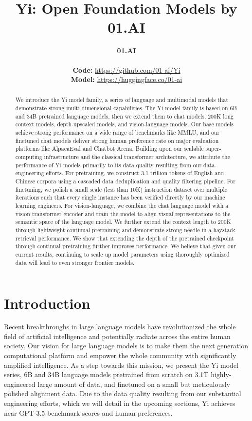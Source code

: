 \documentclass[numbers,sort&compress]{article}
\title{Yi: Open Foundation Models by 01.AI }
\author{
  \textbf{01.AI} \\
  \; \\ 
  \textbf{Code:}\; \url{https://github.com/01-ai/Yi}\\
  \textbf{Model:}\; \url{https://huggingface.co/01-ai} \\
}
\begin{document}
\maketitle

\begin{abstract}

We introduce the Yi model family, a series of language and multimodal models that demonstrate strong multi-dimensional capabilities. 
The Yi model family is based on 6B and 34B pretrained language models, then we extend them to chat models, 200K long context models, depth-upscaled models, and vision-language models. 
Our base models achieve strong performance on a wide range of benchmarks like MMLU, 
and our finetuned chat models deliver strong human preference rate on major evaluation platforms like AlpacaEval and Chatbot Arena.
Building upon our scalable super-computing infrastructure and the classical transformer architecture, 
we attribute the performance of Yi models primarily to its data quality resulting from our data-engineering efforts. 
For pretraining, we construct 3.1 trillion tokens of English and Chinese corpora using a cascaded data deduplication and quality filtering  pipeline. 
For finetuning, we polish a small scale (less than 10K) instruction dataset over multiple iterations such that every single instance has been verified directly by our machine learning engineers.
For vision-language, we combine the chat language model with a vision transformer encoder and train the model to align visual representations to the semantic space of the language model. 
We further extend the context length to 200K through lightweight continual pretraining and demonstrate strong needle-in-a-haystack retrieval performance. 
We show that extending the depth of the pretrained checkpoint through continual pretraining further improves performance. 
We believe that given our current results, continuing to scale up model parameters using thoroughly optimized data will lead to even stronger frontier models.

\end{abstract}

\clearpage
\tableofcontents
\clearpage

\section{Introduction}

Recent breakthroughs in large language models have revolutionized the whole field of artificial intelligence and potentially radiate across the entire human society. 
Our vision for large language models is to make them the next generation computational platform and empower the whole community with significantly amplified intelligence. 
As a step towards this mission, we present the Yi model series, 6B and 34B language models pretrained from scratch on 3.1T highly-engineered large amount of data, and finetuned on a small but meticulously polished alignment data. 
Due to the data quality resulting from our substantial engineering efforts, which we will detail in the upcoming sections, Yi achieves near GPT-3.5 benchmark scores and human preferences. 
\end{document}
